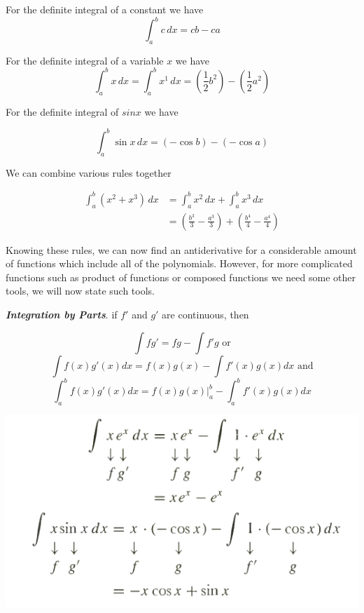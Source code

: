 \documentclass{report}
\begin{document}
    \begin{Example}
        For the definite integral of a constant we have
        $$\int_{a}^{b}c\,dx = cb - ca$$
    \end{Example}

    \begin{Example}
        For the definite integral of a variable $x$ we have
        $$\int_{a}^{b}x\,dx = \int_{a}^{b}x^1\,dx = \left( \dfrac{1}{2}b^2 \right) - \left( \dfrac{1}{2}a^2 \right)$$
    \end{Example}

    \begin{Example}
        For the definite integral of $sin x$ we have

        $$\int_{a}^{b}\sin x \,dx = \left( -\cos b \right) - \left( -\cos a \right)$$
    \end{Example}

    \begin{Example}
        We can combine various rules together

        \begin{align*}
            \int_{a}^{b}(x^2 + x^3) \,dx &= \int_{a}^{b}x^2 \,dx + \int_{a}^{b}x^3 \,dx \\
            &= \left( \frac{b^3}{3} - \frac{a^3}{3} \right) + \left( \frac{b^4}{4} - \frac{a^4}{4} \right)
        \end{align*}
    \end{Example}

    Knowing these rules, we can now find an antiderivative for a considerable amount of functions which include all of the polynomials. However, for more complicated functions such as product of functions or composed functions we need some other tools, we will now state such tools.

    \begin{thBox}
        \textit{\textbf{Integration by Parts}}. if $f'$ and $g'$ are continuous, then

        $$\int fg' = fg - \int f'g \text{ or}$$
        $$\int f(x)g'(x) dx = f(x)g(x) - \int f'(x)g(x)dx \text{ and}$$
        $$\int_{a}^{b} f(x)g'(x) dx = f(x)g(x)\Big|_a^b - \int_a^b f'(x)g(x)dx$$
    \end{thBox}

    \begin{center}
        \includegraphics[width=1\textwidth]{images/productrule.png}
    \end{center}

    
\end{document}
